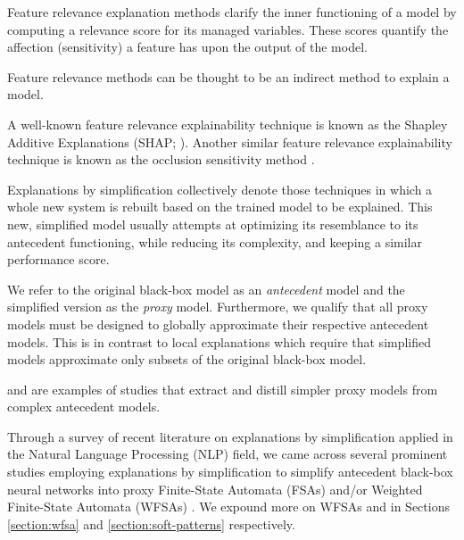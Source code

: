 \begin{definition}
  Feature relevance explanation methods clarify the inner functioning of a model by computing a relevance score for its managed variables. These scores quantify the affection (sensitivity) a feature has upon the output of the model.
\end{definition}

\begin{remark}
  Feature relevance methods can be thought to be an indirect method to explain a model. 
\end{remark}

\begin{remark}
  A well-known feature relevance explainability technique is known as the Shapley Additive Explanations (SHAP; \citealt{lundberg2017unified}). Another similar feature relevance explainability technique is known as the occlusion sensitivity method \citep{zeiler2014visualizing}.
\end{remark}

\begin{definition}
  Explanations by simplification collectively denote those techniques in which a whole new system is rebuilt based on the trained model to be explained. This new, simplified model usually attempts at optimizing its resemblance to its antecedent functioning, while reducing its complexity, and keeping a similar performance score.
\end{definition}

\begin{remark}
  We refer to the original black-box model as an \textit{antecedent} model and the simplified version as the \textit{proxy} model. Furthermore, we qualify that all proxy models must be designed to globally approximate their respective antecedent models. This is in contrast to local explanations which require that simplified models approximate only subsets of the original black-box model.
\end{remark}

\begin{remark}
  \citet{bastani2017interpretability} and \citet{tan2018distill} are examples of studies that extract and distill simpler proxy models from complex antecedent models.
\end{remark}

Through a survey of recent literature on explanations by simplification applied in the Natural Language Processing (NLP) field, we came across several prominent studies employing explanations by simplification to simplify antecedent black-box neural networks into proxy Finite-State Automata (FSAs) and/or Weighted Finite-State Automata (WFSAs) \citep{schwartz2018sopa,peng2018rational,DBLP:journals/corr/abs-1905-08701,wang2019state,jiang2020cold}. We expound more on WFSAs and \citet{schwartz2018sopa} in Sections \ref{section:wfsa} and \ref{section:soft-patterns} respectively.

